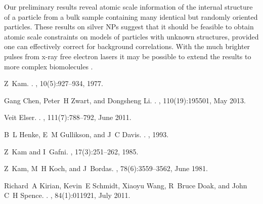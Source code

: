 \documentclass [11pt,fleqn]{article}
\begin{document}
Our preliminary results reveal atomic scale information of the internal structure of a particle from a bulk sample containing many identical  but randomly oriented particles. These results on silver NPs suggest that it should be feasible to obtain atomic scale constraints on models of particles with unknown structures, provided one can effectively correct for background correlations. With the much brighter pulses from x-ray free electron lasers it may be possible to extend the results to more complex biomolecules \cite{Neutze:2000ih, Spence:2012eo}. 



%
%
%
%
\begin{thebibliography}{10}

Z~Kam.
.
, 10(5):927--934, 1977.

Gang Chen, Peter~H Zwart, and Dongsheng Li.
.
, 110(19):195501, May 2013.

Veit Elser.
.
, 111(7):788--792, June 2011.

B~L Henke, E~M Gullikson, and J~C Davis.
.
, 1993.



Z~Kam and I~Gafni.
, 17(3):251--262, 1985.

Z~Kam, M~H Koch, and J~Bordas.
,
  78(6):3559--3562, June 1981.

Richard~A Kirian, Kevin~E Schmidt, Xiaoyu Wang, R~Bruce Doak, and John C~H
  Spence.
.
, 84(1):011921, July 2011.


\end{thebibliography}
\end{document}

